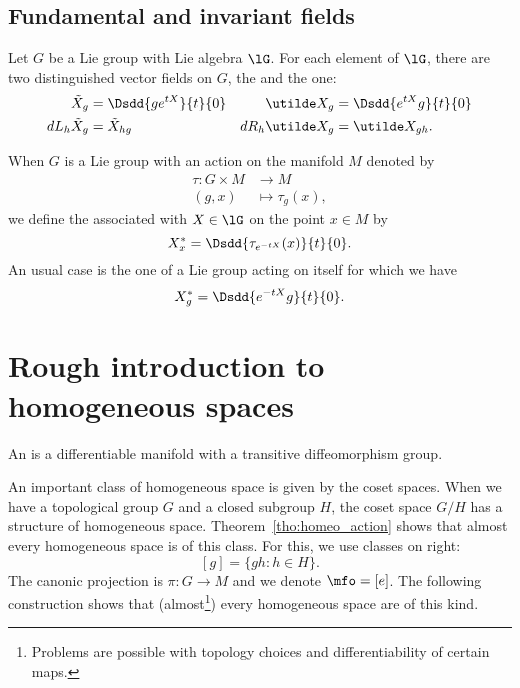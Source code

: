 \subsection{Fundamental and invariant fields}
\label{Subsec_Funda_conv}

Let $G$ be a Lie group with Lie algebra $\lG$. For each element of $\lG$, there are two distinguished vector fields on $G$, the  and the  one:
\begin{align}
\tilde X_g&=\Dsdd{  ge^{tX} }{t}{0}	&\utilde X_g&=\Dsdd{ e^{tX}g }{t}{0}\\
dL_h\tilde X_g&=\tilde X_{hg}		&dR_h\utilde X_g&=\utilde X_{gh}.
\end{align}

When $G$ is a Lie group with an action on the manifold $M$ denoted by
\begin{equation}
\begin{aligned}
 \tau\colon G\times M&\to M \\
(g,x)&\mapsto \tau_g(x),
\end{aligned}
\end{equation}
we define the  associated with $X\in\lG$ on the point $x\in M$ by
\begin{equation}			\label{EqDefChmpFonfOff}
X^*_x=\Dsdd{ \tau_{ e^{-tX}}(x) }{t}{0}.
\end{equation}
An usual case is the one of a Lie group acting on itself for which we have
\begin{equation}		\label{EqChmpFondGp}
  X^*_g=\Dsdd{ e^{-tX}g }{t}{0}.
\end{equation}

\section{Rough introduction to homogeneous spaces}
\label{SubSechoappahomsp}\label{SecRoughomo}

An \label{pg:esp_homo} is a differentiable manifold with a transitive diffeomorphism group.

An important class of homogeneous space is given by the coset spaces. When we have a topological group $G$ and a closed subgroup $H$, the coset space $G/H$ has a structure of homogeneous space. Theorem~\ref{tho:homeo_action} shows that almost every homogeneous space is of this class. For this, we use classes on right:
\[
  [g]=\{gh:h\in H\}.
\]
The canonic projection is $\pi\colon G\to M$ and we denote $\mfo=[e]$. The following construction shows that (almost\footnote{Problems are possible with topology choices and differentiability of certain maps.}) every homogeneous space are of this kind.

